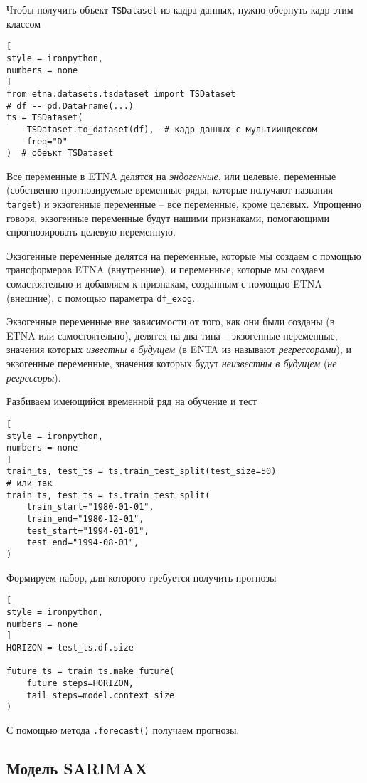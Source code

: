 \documentclass[%
	11pt,
	a4paper,
	utf8,
		]{article}
\begin{document}
Чтобы получить объект \verb|TSDataset| из кадра данных, нужно обернуть кадр этим классом
\begin{lstlisting}[
style = ironpython,
numbers = none
]
from etna.datasets.tsdataset import TSDataset
# df -- pd.DataFrame(...)
ts = TSDataset(
    TSDataset.to_dataset(df),  # кадр данных с мультииндексом
    freq="D"
)  # обеъкт TSDataset
\end{lstlisting}

Все переменные в ETNA делятся на \emph{эндогенные}, или целевые, переменные (собственно прогнозируемые временные ряды, которые получают названия \verb|target|) и экзогенные переменные -- все переменные, кроме целевых. Упрощенно говоря, экзогенные переменные будут нашими признаками, помогающими спрогнозировать целевую переменную.

Экзогенные переменные делятся на переменные, которые мы создаем с помощью трансформеров ETNA (внутренние), и переменные, которые мы создаем сомастоятельно и добавляем к признакам, созданным с помощью ETNA (внешние), с помощью параметра \verb|df_exog|. 

Экзогенные переменные вне зависимости от того, как они были созданы (в ETNA или самостоятельно), делятся на два типа -- экзогенные переменные, значения которых \emph{известны в будущем} (в ENTA из называют \emph{регрессорами}), и экзогенные переменные, значения которых будут \emph{неизвестны в будущем} (\emph{не регрессоры}).

Разбиваем имеющийся временной ряд на обучение и тест
\begin{lstlisting}[
style = ironpython,
numbers = none
]
train_ts, test_ts = ts.train_test_split(test_size=50)
# или так
train_ts, test_ts = ts.train_test_split(
    train_start="1980-01-01",
    train_end="1980-12-01",
    test_start="1994-01-01",
    test_end="1994-08-01",
)
\end{lstlisting}

Формируем набор, для которого требуется получить прогнозы
\begin{lstlisting}[
style = ironpython,
numbers = none
]
HORIZON = test_ts.df.size

future_ts = train_ts.make_future(
    future_steps=HORIZON,
    tail_steps=model.context_size
)
\end{lstlisting}

С помощью метода \verb|.forecast()| получаем прогнозы. 

\subsection{Модель SARIMAX}
\end{document}
